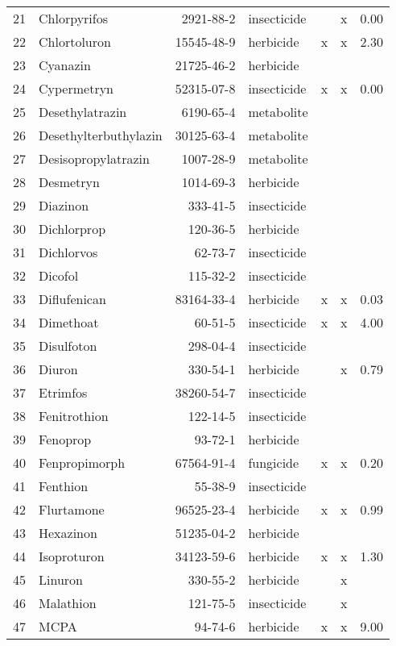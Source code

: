 \begin{longtable}{lp{3cm}rlp{0.5cm}p{0.5cm}p{1cm}}
  21 & Chlorpyrifos & 2921-88-2 & insecticide &  & x & 0.00 \\ 
  22 & Chlortoluron & 15545-48-9 & herbicide & x & x & 2.30 \\ 
  23 & Cyanazin & 21725-46-2 & herbicide &  &  &  \\ 
  24 & Cypermetryn & 52315-07-8 & insecticide & x & x & 0.00 \\ 
  25 & Desethylatrazin & 6190-65-4 & metabolite &  &  &  \\ 
  26 & Desethylterbuthylazin & 30125-63-4 & metabolite &  &  &  \\ 
  27 & Desisopropylatrazin & 1007-28-9 & metabolite &  &  &  \\ 
  28 & Desmetryn & 1014-69-3 & herbicide &  &  &  \\ 
  29 & Diazinon & 333-41-5 & insecticide &  &  &  \\ 
  30 & Dichlorprop & 120-36-5 & herbicide &  &  &  \\ 
  31 & Dichlorvos & 62-73-7 & insecticide &  &  &  \\ 
  32 & Dicofol & 115-32-2 & insecticide &  &  &  \\ 
  33 & Diflufenican & 83164-33-4 & herbicide & x & x & 0.03 \\ 
  34 & Dimethoat & 60-51-5 & insecticide & x & x & 4.00 \\ 
  35 & Disulfoton & 298-04-4 & insecticide &  &  &  \\ 
  36 & Diuron & 330-54-1 & herbicide &  & x & 0.79 \\ 
  37 & Etrimfos & 38260-54-7 & insecticide &  &  &  \\ 
  38 & Fenitrothion & 122-14-5 & insecticide &  &  &  \\ 
  39 & Fenoprop & 93-72-1 & herbicide &  &  &  \\ 
  40 & Fenpropimorph & 67564-91-4 & fungicide & x & x & 0.20 \\ 
  41 & Fenthion & 55-38-9 & insecticide &  &  &  \\ 
  42 & Flurtamone & 96525-23-4 & herbicide & x & x & 0.99 \\ 
  43 & Hexazinon & 51235-04-2 & herbicide &  &  &  \\ 
  44 & Isoproturon & 34123-59-6 & herbicide & x & x & 1.30 \\ 
  45 & Linuron & 330-55-2 & herbicide &  & x &  \\ 
  46 & Malathion & 121-75-5 & insecticide &  & x &  \\ 
  47 & MCPA & 94-74-6 & herbicide & x & x & 9.00 \\ 

\end{longtable}
